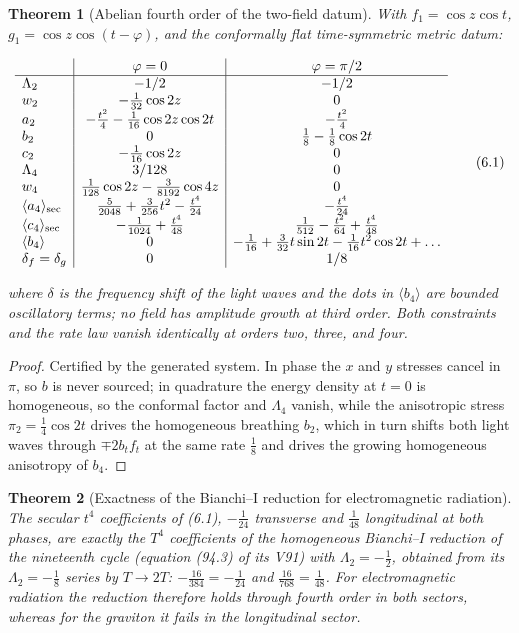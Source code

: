 \documentclass[11pt]{article}
\newtheorem{theorem}{Theorem}[section]
\theoremstyle{remark}
\begin{document}
\begin{theorem}[Abelian fourth order of the two-field datum]
\label{thm:v20v3-fourth}
With \(f_1=\cos z\cos t\), \(g_1=\cos z\cos(t-\varphi)\), and the
conformally flat time-symmetric metric datum:

\[
\begin{array}{l|c|c}
&\varphi=0&\varphi=\pi/2\\ \hline
\Lambda_2&-1/2&-1/2\\
w_2&-\tfrac1{32}\cos2z&0\\
a_2&-\tfrac{t^2}4-\tfrac1{16}\cos2z\cos2t&-\tfrac{t^2}4\\
b_2&0&\tfrac18-\tfrac18\cos2t\\
c_2&-\tfrac1{16}\cos2z&0\\
\Lambda_4&3/128&0\\
w_4&\tfrac1{128}\cos2z-\tfrac3{8192}\cos4z&0\\
\langle a_4\rangle_{\rm sec}&\tfrac5{2048}+\tfrac3{256}t^2-\tfrac{t^4}{24}&-\tfrac{t^4}{24}\\
\langle c_4\rangle_{\rm sec}&-\tfrac1{1024}+\tfrac{t^4}{48}&\tfrac1{512}-\tfrac{t^2}{64}+\tfrac{t^4}{48}\\
\langle b_4\rangle&0&-\tfrac1{16}+\tfrac3{32}t\sin2t-\tfrac1{16}t^2\cos2t+\dots\\
\delta_f=\delta_g&0&1/8
\end{array}                                                            \tag{6.1}
\]

where \(\delta\) is the frequency shift of the light waves and the dots
in \(\langle b_4\rangle\) are bounded oscillatory terms; no field has
amplitude growth at third order.  Both constraints and the rate law
vanish identically at orders two, three, and four.
\end{theorem}

\begin{proof}
Certified by the generated system.  In phase the \(x\) and \(y\)
stresses cancel in \(\pi\), so \(b\) is never sourced; in quadrature
the energy density at \(t=0\) is homogeneous, so the conformal factor
and \(\Lambda_4\) vanish, while the anisotropic stress
\(\pi_2=\tfrac14\cos2t\) drives the homogeneous breathing \(b_2\), which
in turn shifts both light waves through \(\mp2b_tf_t\) at the same
rate \(\tfrac18\) and drives the growing homogeneous anisotropy of
\(b_4\).
\end{proof}

\begin{theorem}[Exactness of the Bianchi--I reduction for electromagnetic radiation]
\label{thm:v20v3-bianchi}
The secular \(t^4\) coefficients of (6.1), \(-\tfrac1{24}\)
transverse and \(\tfrac1{48}\) longitudinal at both phases, are
exactly the \(T^4\) coefficients of the homogeneous Bianchi--I
reduction of the nineteenth cycle (equation (94.3) of its V91) with
\(\Lambda_2=-\tfrac12\), obtained from its \(\Lambda_2=-\tfrac18\)
series by \(T\to2T\): \(-\tfrac{16}{384}=-\tfrac1{24}\) and
\(\tfrac{16}{768}=\tfrac1{48}\).  For electromagnetic radiation the
reduction therefore holds through fourth order in both sectors,
whereas for the graviton it fails in the longitudinal sector.
\end{theorem}
\end{document}
